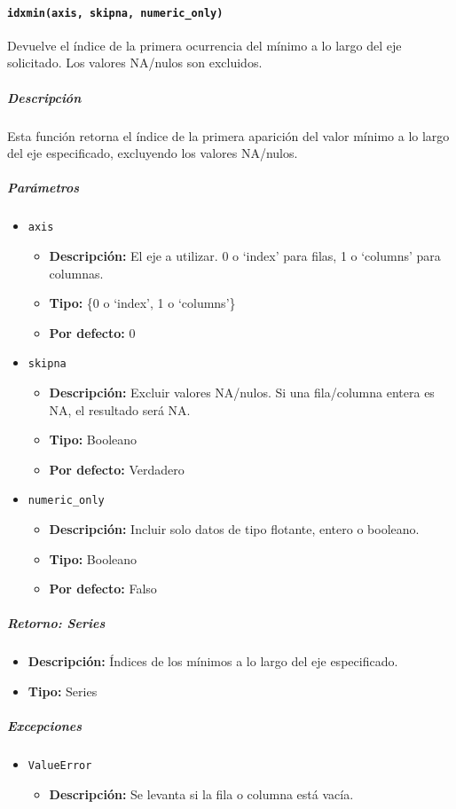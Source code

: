 \paragraph{\texttt{idxmin(axis, skipna, numeric\_only)}} Devuelve el índice de la primera ocurrencia del mínimo a lo largo del eje solicitado. Los valores NA/nulos son excluidos.
\subparagraph{\textbf{Descripción}}
Esta función retorna el índice de la primera aparición del valor mínimo a lo largo del eje especificado, excluyendo los valores NA/nulos.
\subparagraph{\textbf{Parámetros}}
\begin{itemize}
\item \texttt{axis}
\begin{itemize}
\item \textbf{Descripción:} El eje a utilizar. 0 o `index' para filas, 1 o `columns' para columnas.
\item \textbf{Tipo:} \{0 o `index', 1 o `columns'\}
\item \textbf{Por defecto:} 0
\end{itemize}
\item \texttt{skipna}
\begin{itemize}
\item \textbf{Descripción:} Excluir valores NA/nulos. Si una fila/columna entera es NA, el resultado será NA.
\item \textbf{Tipo:} Booleano
\item \textbf{Por defecto:} Verdadero
\end{itemize}
\item \texttt{numeric\_only}
\begin{itemize}
\item \textbf{Descripción:} Incluir solo datos de tipo flotante, entero o booleano.
\item \textbf{Tipo:} Booleano
\item \textbf{Por defecto:} Falso
\end{itemize}
\end{itemize}
\subparagraph{\textbf{Retorno:} Series}
\begin{itemize}
\item \textbf{Descripción:} Índices de los mínimos a lo largo del eje especificado.
\item \textbf{Tipo:} Series
\end{itemize}
\subparagraph{\textbf{Excepciones}}
\begin{itemize}
\item \texttt{ValueError}
\begin{itemize}
\item \textbf{Descripción:} Se levanta si la fila o columna está vacía.
\end{itemize}
\end{itemize}
